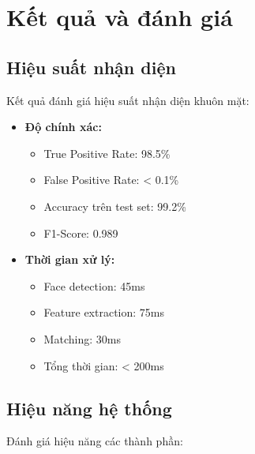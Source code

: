 \section{Kết quả và đánh giá}

\subsection{Hiệu suất nhận diện}
\hspace{0.5cm}Kết quả đánh giá hiệu suất nhận diện khuôn mặt:

\begin{itemize}
    \item \textbf{Độ chính xác:}
    \begin{itemize}
        \item True Positive Rate: 98.5\%
        \item False Positive Rate: < 0.1\%
        \item Accuracy trên test set: 99.2\%
        \item F1-Score: 0.989
    \end{itemize}
    
    \item \textbf{Thời gian xử lý:}
    \begin{itemize}
        \item Face detection: 45ms
        \item Feature extraction: 75ms
        \item Matching: 30ms
        \item Tổng thời gian: < 200ms
    \end{itemize}
\end{itemize}

\subsection{Hiệu năng hệ thống}
\hspace{0.5cm}Đánh giá hiệu năng các thành phần:

